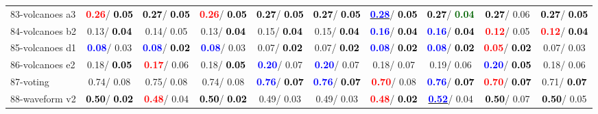 \begin{table}[h]
\begin{center}
{\begin{tabular}{lc|c|c|c|c|c|c|c|c}
83-volcanoes a3 & \textcolor{red}{\textbf{  0.26}}/\textcolor{black}{\textbf{  0.05}} & \textcolor{black}{\textbf{  0.27}}/\textcolor{black}{\textbf{  0.05}} & \textcolor{red}{\textbf{  0.26}}/\textcolor{black}{\textbf{  0.05}} & \textcolor{black}{\textbf{  0.27}}/\textcolor{black}{\textbf{  0.05}} & \textcolor{black}{\textbf{  0.27}}/\textcolor{black}{\textbf{  0.05}} & \underline{\textcolor{blue}{\textbf{  0.28}}}/\textcolor{black}{\textbf{  0.05}} & \textcolor{black}{\textbf{  0.27}}/\textcolor{darkgreen}{\textbf{  0.04}} & \textcolor{black}{\textbf{  0.27}}/  0.06 & \textcolor{black}{\textbf{  0.27}}/\textcolor{black}{\textbf{  0.05}} \\
84-volcanoes b2 &   0.13/\textcolor{black}{\textbf{  0.04}} &   0.14/  0.05 &   0.13/\textcolor{black}{\textbf{  0.04}} &   0.15/\textcolor{black}{\textbf{  0.04}} &   0.15/\textcolor{black}{\textbf{  0.04}} & \textcolor{blue}{\textbf{  0.16}}/\textcolor{black}{\textbf{  0.04}} & \textcolor{blue}{\textbf{  0.16}}/\textcolor{black}{\textbf{  0.04}} & \textcolor{red}{\textbf{  0.12}}/  0.05 & \textcolor{red}{\textbf{  0.12}}/\textcolor{black}{\textbf{  0.04}} \\
85-volcanoes d1 & \textcolor{blue}{\textbf{  0.08}}/  0.03 & \textcolor{blue}{\textbf{  0.08}}/\textcolor{black}{\textbf{  0.02}} & \textcolor{blue}{\textbf{  0.08}}/  0.03 &   0.07/\textcolor{black}{\textbf{  0.02}} &   0.07/\textcolor{black}{\textbf{  0.02}} & \textcolor{blue}{\textbf{  0.08}}/\textcolor{black}{\textbf{  0.02}} & \textcolor{blue}{\textbf{  0.08}}/\textcolor{black}{\textbf{  0.02}} & \textcolor{red}{\textbf{  0.05}}/\textcolor{black}{\textbf{  0.02}} &   0.07/  0.03 \\ \hline
86-volcanoes e2 &   0.18/\textcolor{black}{\textbf{  0.05}} & \textcolor{red}{\textbf{  0.17}}/  0.06 &   0.18/\textcolor{black}{\textbf{  0.05}} & \textcolor{blue}{\textbf{  0.20}}/  0.07 & \textcolor{blue}{\textbf{  0.20}}/  0.07 &   0.18/  0.07 &   0.19/  0.06 & \textcolor{blue}{\textbf{  0.20}}/\textcolor{black}{\textbf{  0.05}} &   0.18/  0.06 \\
87-voting &   0.74/  0.08 &   0.75/  0.08 &   0.74/  0.08 & \textcolor{blue}{\textbf{  0.76}}/\textcolor{black}{\textbf{  0.07}} & \textcolor{blue}{\textbf{  0.76}}/\textcolor{black}{\textbf{  0.07}} & \textcolor{red}{\textbf{  0.70}}/  0.08 & \textcolor{blue}{\textbf{  0.76}}/\textcolor{black}{\textbf{  0.07}} & \textcolor{red}{\textbf{  0.70}}/\textcolor{black}{\textbf{  0.07}} &   0.71/\textcolor{black}{\textbf{  0.07}} \\
88-waveform v2 & \textcolor{black}{\textbf{  0.50}}/\textcolor{black}{\textbf{  0.02}} & \textcolor{red}{\textbf{  0.48}}/  0.04 & \textcolor{black}{\textbf{  0.50}}/\textcolor{black}{\textbf{  0.02}} &   0.49/  0.03 &   0.49/  0.03 & \textcolor{red}{\textbf{  0.48}}/\textcolor{black}{\textbf{  0.02}} & \underline{\textcolor{blue}{\textbf{  0.52}}}/  0.04 & \textcolor{black}{\textbf{  0.50}}/  0.07 & \textcolor{black}{\textbf{  0.50}}/  0.05 \\

\end{tabular}}
\end{center}
\end{table}
